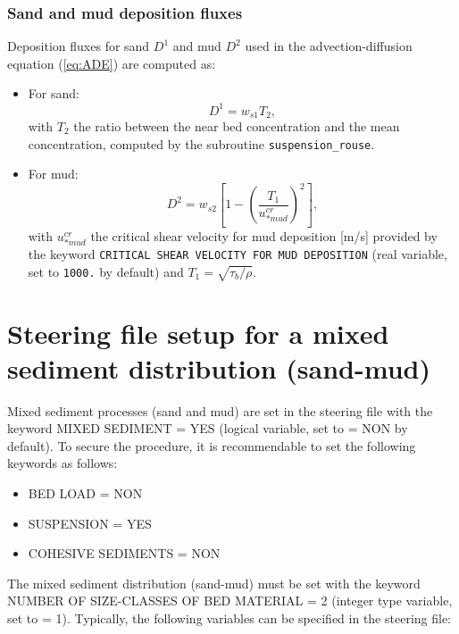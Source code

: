 \subsubsection{Sand and mud deposition fluxes}
Deposition fluxes for sand $D^1$ and mud $D^2$ used in the advection-diffusion equation (\ref{eq:ADE}) are computed as:
\begin{itemize}
\item For sand:
\begin{equation}
D^1 = w_{s1} T_2, 
\end{equation}
with $T_2$ the ratio between the near bed concentration and the mean concentration, computed by the subroutine \texttt{suspension\_rouse}. 

\item For mud:
\begin{equation}
D^2 = w_{s2} \left[1-\left(\frac{T_1}{u_{*mud}^{cr}}\right)^2 \right],
\end{equation}
with $u_{*mud}^{cr}$ the critical shear velocity for mud deposition [m/s] provided by the keyword \texttt{CRITICAL SHEAR VELOCITY FOR MUD DEPOSITION} (real variable, set to \texttt{1000.} by default) and $T_1=\sqrt{\tau_b/\rho}$.

\end{itemize}

\section{Steering file setup for a mixed sediment distribution (sand-mud)}\label{sec:}
Mixed sediment processes (sand and mud) are set in the \sisyphe{} steering file with the keyword
{\ttfamily MIXED SEDIMENT = YES} (logical variable, set to {\ttfamily = NON} by default). To secure the procedure, it is recommendable to set the following keywords as follows:
\begin{itemize}
\item {\ttfamily BED LOAD = NON}
\item {\ttfamily SUSPENSION = YES}
\item {\ttfamily COHESIVE SEDIMENTS = NON}  
\end{itemize}

The mixed sediment distribution (sand-mud) must be set with the keyword {\ttfamily NUMBER OF SIZE-CLASSES OF BED MATERIAL = 2} (integer type variable, set to {\ttfamily = 1}). Typically, the following variables can be specified in the steering file:

